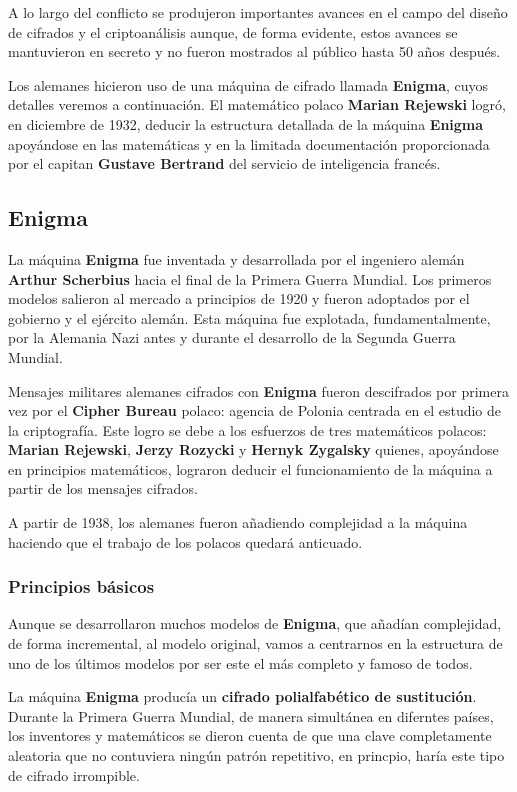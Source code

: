 \documentclass[nochap]{apuntesURJC}
\begin{document}
A lo largo del conflicto se produjeron importantes avances en el campo del diseño de cifrados y el criptoanálisis aunque, de forma evidente, estos avances se mantuvieron en secreto y no fueron mostrados al público hasta 50 años después.

Los alemanes hicieron uso de una máquina de cifrado llamada \textbf{Enigma}, cuyos detalles veremos a continuación. El matemático polaco \textbf{Marian Rejewski} logró, en diciembre de 1932, deducir la estructura detallada de la máquina \textbf{Enigma} apoyándose en las matemáticas y en la limitada documentación proporcionada por el capitan \textbf{Gustave Bertrand} del servicio de inteligencia francés.

\subsection{Enigma}
La máquina \textbf{Enigma} fue inventada y desarrollada por el ingeniero alemán \textbf{Arthur Scherbius} hacia el final de la Primera Guerra Mundial. Los primeros modelos salieron al mercado a principios de 1920 y fueron adoptados por el gobierno y el ejército alemán. Esta máquina fue explotada, fundamentalmente, por la Alemania Nazi antes y durante el desarrollo de la Segunda Guerra Mundial.

Mensajes militares alemanes cifrados con \textbf{Enigma} fueron descifrados por primera vez por el \textbf{Cipher Bureau} polaco: agencia de Polonia centrada en el estudio de la criptografía. Este logro se debe a los esfuerzos de tres matemáticos polacos: \textbf{Marian Rejewski}, \textbf{Jerzy Rozycki} y \textbf{Hernyk Zygalsky} quienes, apoyándose en principios matemáticos, lograron deducir el funcionamiento de la máquina a partir de los mensajes cifrados.

A partir de 1938, los alemanes fueron añadiendo complejidad a la máquina haciendo que el trabajo de los polacos quedará anticuado.

\subsubsection{Principios básicos}

Aunque se desarrollaron muchos modelos de \textbf{Enigma}, que añadían complejidad, de forma incremental, al modelo original, vamos a centrarnos en la estructura de uno de los últimos modelos por ser este el más completo y famoso de todos.

La máquina \textbf{Enigma} producía un \textbf{cifrado polialfabético de sustitución}. Durante la Primera Guerra Mundial, de manera simultánea en diferntes países, los inventores y matemáticos se dieron cuenta de que una clave completamente aleatoria que no contuviera ningún patrón repetitivo, en princpio, haría este tipo de cifrado irrompible.
\end{document}
